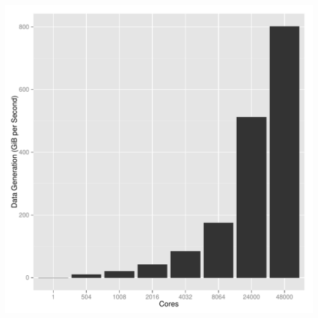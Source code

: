\begin{frame}
  \begin{block}{}
  \begin{center}
    \includegraphics[height=.88\textheight]{../common/pics/benchmarks/datagen24k}
  \end{center}
  \end{block}
\end{frame}

